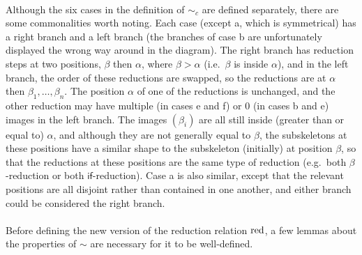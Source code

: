 \paragraph{}
Although the six cases in the definition of $\sim_c$ are defined separately, there are some commonalities worth noting. Each case (except a, which is symmetrical) has a right branch and a left branch (the branches of case b are unfortunately displayed the wrong way around in the diagram). The right branch has reduction steps at two positions, $\beta$ then $\alpha$, where $\beta > \alpha$ (i.e.~$\beta$ is inside $\alpha$), and in the left branch, the order of these reductions are swapped, so the reductions are at $\alpha$ then $\beta_1, \dots, \beta_n$. The position $\alpha$ of one of the reductions is unchanged, and the other reduction may have multiple (in cases e and f) or 0 (in cases b and e) images in the left branch. The images $(\beta_i)$ are all still inside (greater than or equal to) $\alpha$, and although they are not generally equal to $\beta$, the subskeletons at these positions have a similar shape to the subskeleton (initially) at position $\beta$, so that the reductions at these positions are the same type of reduction (e.g.~both $\beta$-reduction or both $\textsf{if}$-reduction). Case a is also similar, except that the relevant positions are all disjoint rather than contained in one another, and either branch could be considered the right branch.

\iffalse
\changed[lo]{Since $L_s(M)$ is a countable set, there is a unique probability measure $\mu$ on the infinite product $\prod_{i \in L_s(M)} \Sigma_I$ of the Borel $\sigma$-algebras $\Sigma_I$ satisfying
\[
\mu\set{\omega \in \Omega \mid \omega_1 \in A_1, \cdots, \omega_n \in A_n} = \prod_{i=1}^n \Leb(A_i)
\]
where $\Leb$ is the Lebesgue measure on the measurable space $(I, \Sigma_I)$.}
\fi

\paragraph{}
Before defining the new version of the reduction relation $\operatorname{red}$, a few lemmas about the properties of $\sim$ are necessary for it to be well-defined.

